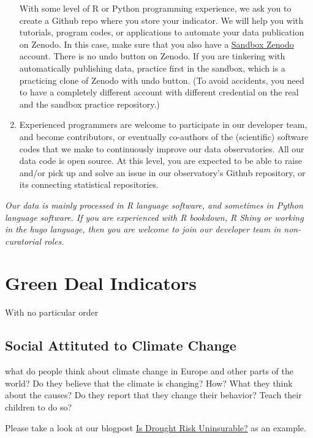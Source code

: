 \documentclass[
  a4paper,
  openany, a4paper, oneside]{book}
\begin{document}
\begin{enumerate}
  With some level of R or Python programming experience, we ask you to create a Github repo where you store your indicator. We will help you with tutorials, program codes, or applications to automate your data publication on Zenodo. In this case, make sure that you also have a \href{https://sandbox.zenodo.org/}{Sandbox Zenodo} account. There is no undo button on Zenodo. If you are tinkering with automatically publishing data, practice first in the sandbox, which is a practicing clone of Zenodo with undo button. (To avoid accidents, you need to have a completely different account with different credential on the real and the sandbox practice repository.)
\item
  Experienced programmers are welcome to participate in our developer team, and become contributors, or eventually co-authors of the (scientific) software codes that we make to continuously improve our data observatories. All our data code is open source. At this level, you are expected to be able to raise and/or pick up and solve an issue in our observatory's Github repository, or its connecting statistical repositories.
\end{enumerate}

\emph{Our data is mainly processed in R language software, and sometimes in Python language software. If you are experienced with R bookdown, R Shiny or working in the hugo language, then you are welcome to join our developer team in non-curatorial roles.}

\hypertarget{green-deal}{%
\chapter{Green Deal Indicators}\label{green-deal}}

With no particular order

\hypertarget{social-attituted-to-climate-change}{%
\section{Social Attituted to Climate Change}\label{social-attituted-to-climate-change}}

what do people think about climate change in Europe and other parts of the world? Do they believe that the climate is changing? How? What they think about the causes? Do they report that they change their behavior? Teach their children to do so?

Please take a look at our blogpost \href{http://greendeal.dataobservatory.eu/post/2021-04-23-belgium-flood-insurance/}{Is Drought Risk Uninsurable?} as an example.
\end{document}
